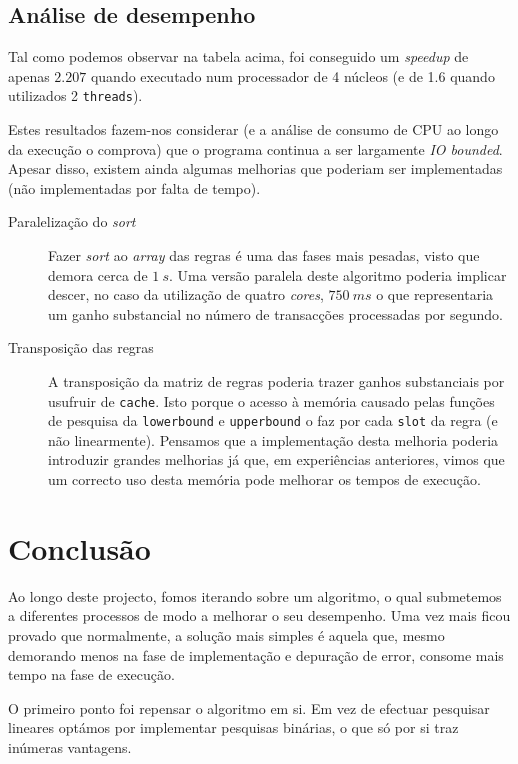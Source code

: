 \documentclass[a4paper]{article}
\begin{document}
\subsection{Análise de desempenho}
\indent \indent Tal como podemos observar na tabela acima, foi conseguido um \textit{speedup} de apenas $2.207$ quando executado num processador de 4 núcleos (e de 1.6 quando utilizados 2 \texttt{threads}).

Estes resultados fazem-nos considerar (e a análise de consumo de CPU ao longo da execução o comprova) que o programa continua a ser largamente \textit{IO bounded}. Apesar disso, existem ainda algumas melhorias que poderiam ser implementadas (não implementadas por falta de tempo).

\begin{description}
	\item [Paralelização do \textit{sort}] Fazer \textit{sort} ao \textit{array} das regras é uma das fases mais pesadas, visto que demora cerca de $1~s$. Uma versão paralela deste algoritmo poderia implicar descer, no caso da utilização de quatro \textit{cores}, $750~ms$ o que representaria um ganho substancial no número de transacções processadas por segundo.

	\item [Transposição das regras] A transposição da matriz de regras poderia trazer ganhos substanciais por usufruir de \texttt{cache}. Isto porque o acesso à memória causado pelas funções de pesquisa da \texttt{lowerbound} e \texttt{upperbound} o faz por cada \texttt{slot} da regra (e não linearmente). Pensamos que a implementação desta melhoria poderia introduzir grandes melhorias já que, em experiências anteriores, vimos que um correcto uso desta memória pode melhorar os tempos de execução.
\end{description}

\clearpage

\section{Conclusão}
\indent \indent Ao longo deste projecto, fomos iterando sobre um algoritmo, o qual submetemos a diferentes processos de modo a melhorar o seu desempenho. Uma vez mais ficou provado que normalmente, a solução mais simples é aquela que, mesmo demorando menos na fase de implementação e depuração de error, consome mais tempo na fase de execução.

O primeiro ponto foi repensar o algoritmo em si. Em vez de efectuar pesquisar lineares optámos por implementar pesquisas binárias, o que só por si traz inúmeras vantagens.
\end{document}
